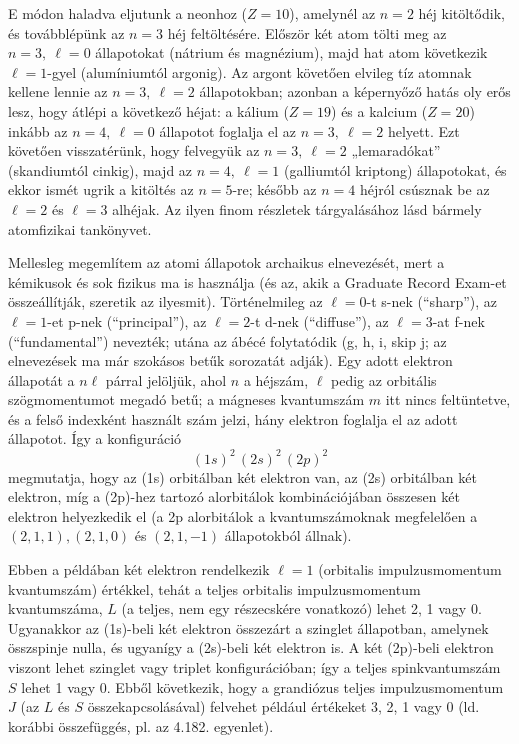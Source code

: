 \documentclass[../main.tex]{subfiles}
\begin{document}
E módon haladva eljutunk a neonhoz ($Z=10$), amelynél az $n=2$ héj kitöltődik, és továbblépünk az $n=3$ héj feltöltésére. Először két atom tölti meg az $n=3,\ \ell=0$ állapotokat (nátrium és magnézium), majd hat atom következik $\ell=1$-gyel (alumíniumtól argonig). Az argont követően elvileg tíz atomnak kellene lennie az $n=3,\ \ell=2$ állapotokban; azonban a képernyőző hatás oly erős lesz, hogy átlépi a következő héjat: a kálium ($Z=19$) és a kalcium ($Z=20$) inkább az $n=4,\ \ell=0$ állapotot foglalja el az $n=3,\ \ell=2$ helyett. Ezt követően visszatérünk, hogy felvegyük az $n=3,\ \ell=2$ „lemaradókat” (skandiumtól cinkig), majd az $n=4,\ \ell=1$ (galliumtól kriptong) állapotokat, és ekkor ismét ugrik a kitöltés az $n=5$-re; később az $n=4$ héjról csúsznak be az $\ell=2$ és $\ell=3$ alhéjak. Az ilyen finom részletek tárgyalásához lásd bármely atomfizikai tankönyvet.

Mellesleg megemlítem az atomi állapotok archaikus elnevezését, mert a kémikusok és sok fizikus ma is használja (és az, akik a Graduate Record Exam-et összeállítják, szeretik az ilyesmit). Történelmileg az $\ell=0$-t s-nek (``sharp''), az $\ell=1$-et p-nek (``principal''), az $\ell=2$-t d-nek (``diffuse''), az $\ell=3$-at f-nek (``fundamental'') nevezték; utána az ábécé folytatódik (g, h, i, skip j; az elnevezések ma már szokásos betűk sorozatát adják). Egy adott elektron állapotát a $n\ell$ párral jelöljük, ahol $n$ a héjszám, $\ell$ pedig az orbitális szögmomentumot megadó betű; a mágneses kvantumszám $m$ itt nincs feltüntetve, és a felső indexként használt szám jelzi, hány elektron foglalja el az adott állapotot. 
Így a konfiguráció 
\[
(1s)^2\,(2s)^2\,(2p)^2
\tag{5.44}
\]
megmutatja, hogy az (1s) orbitálban két elektron van, az (2s) orbitálban két elektron, míg a (2p)-hez tartozó alorbitálok kombinációjában összesen két elektron helyezkedik el (a 2p alorbitálok a kvantumszámoknak megfelelően a $(2,1,1),(2,1,0)$ és $(2,1,-1)$ állapotokból állnak).

Ebben a példában két elektron rendelkezik $\ell=1$ (orbitalis impulzusmomentum kvantumszám) értékkel, tehát a teljes orbitalis impulzusmomentum kvantumszáma, $L$ (a teljes, nem egy részecskére vonatkozó) lehet 2, 1 vagy 0. Ugyanakkor az (1s)-beli két elektron összezárt a szinglet állapotban, amelynek összspinje nulla, és ugyanígy a (2s)-beli két elektron is. A két (2p)-beli elektron viszont lehet szinglet vagy triplet konfigurációban; így a teljes spinkvantumszám $S$ lehet 1 vagy 0. Ebből következik, hogy a grandiózus teljes impulzusmomentum $J$ (az $L$ és $S$ összekapcsolásával) felvehet például értékeket 3, 2, 1 vagy 0 (ld. korábbi összefüggés, pl. az 4.182. egyenlet).
\end{document}
